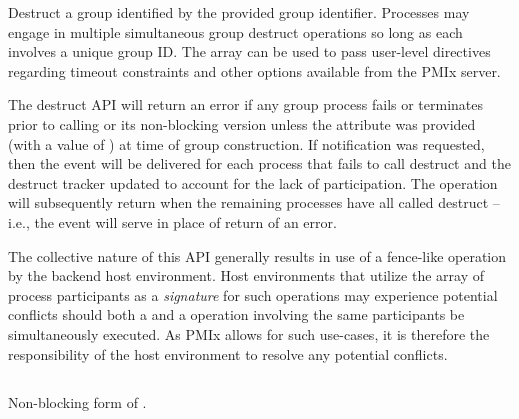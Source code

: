 
\optattrend

\descr

Destruct a group identified by the provided group identifier. Processes may engage in multiple simultaneous group destruct operations so long as each involves a unique group ID. The  array can be used to pass user-level directives regarding timeout constraints and other options available from the \ac{PMIx} server.

The destruct \ac{API} will return an error if any group process fails or terminates prior to calling  or its non-blocking version unless the  attribute was provided (with a value of ) at time of group construction. If notification was requested, then the  event will be delivered for each process that fails to call destruct and the destruct tracker updated to account for the lack of participation. The  operation will subsequently return  when the remaining processes have all called destruct – i.e., the event will serve in place of return of an error.

\advicermstart
The collective nature of this \ac{API} generally results in use of a fence-like operation by the backend host environment. Host environments that utilize the array of process participants as a \emph{signature} for such operations may experience potential conflicts should both a  and a  operation involving the same participants be simultaneously executed. As \ac{PMIx} allows for such use-cases, it is therefore the responsibility of the host environment to resolve any potential conflicts.
\advicermend

\subsection{}

\summary

Non-blocking form of .

\format



